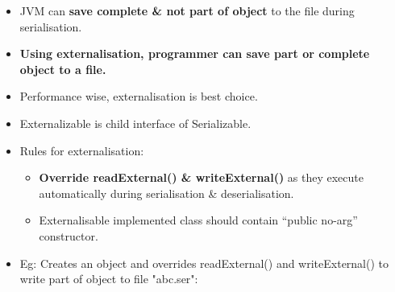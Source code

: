 \setlength{\columnsep}{3pt}
\begin{flushleft}
	\begin{itemize}
		\item JVM can \textbf{save complete \& not part of object} to the file during serialisation.
		\item \textbf{Using externalisation, programmer can save part or complete object to a file.}
		\item Performance wise, externalisation is best choice.
		\item Externalizable is child interface of Serializable.
		

		\item Rules for externalisation:
		\begin{itemize}
			\item \textbf{Override readExternal() \& writeExternal()} as they execute automatically during serialisation \& deserialisation.
			\item Externalisable implemented class should contain “public no-arg” constructor. 
		\end{itemize}
		\item Eg: Creates an object and overrides readExternal() and writeExternal() to write part of object to file "abc.ser":
		\newpage
\end{itemize}
\end{flushleft}
